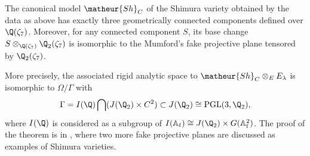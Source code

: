 \begin{appthm}\label{thm-uniformization}

The canonical model $\matheur{Sh}_C$ of the Shimura variety obtained by
the data as above has exactly three geometrically connected components defined
over $\Q(\zeta_7)$. Moreover, for any connected component $S$, its
base change $S\otimes_{\Q(\zeta_7)}\Q_2(\zeta_7)$ is isomorphic to the
Mumford's fake projective plane \cite{aaswkak9pq0} tensored by $\Q_2(\zeta_7)$.
\end{appthm}

More precisely, the associated rigid analytic space to 
$\matheur{Sh}_C\otimes_EE_{\lambda}$ is isomorphic to
$\Omega/\Gamma$ with
$$
\Gamma=I(\Q)\bigcap(J(\Q_2)\times C^2)\subset J(\Q_2)\cong
\mathrm{PGL}(3,\Q_2),
$$
where $I(\Q)$ is considered as a subgroup of 
$I(\mathbb{A}_{\mathrm{f}})\cong J(\Q_2)\times 
G(\mathbb{A}^2_{\mathrm{f}})$.
The proof of the theorem is in \cite{opuofpp}, where two more 
fake projective planes are
discussed as examples of Shimura varieties.

